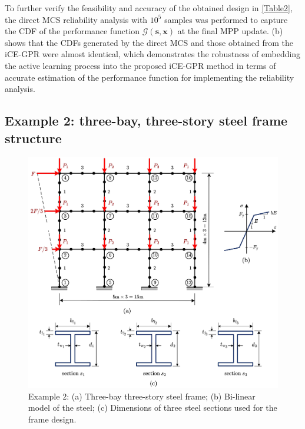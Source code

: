 \documentclass[preprint,3p]{elsarticle}
\begin{document}
\begin{linenumbers}
To further verify the feasibility and accuracy of the obtained design in \cref{Table2}, the direct MCS reliability analysis with $10^5$ samples was performed to capture the CDF of the performance function $\mathcal{G}(\textbf{s},\textbf{x})$ at the final MPP update. (b) shows that the CDFs generated by the direct MCS and those obtained from the iCE-GPR were almost identical, which demonstrates the robustness of embedding the active learning process into the proposed iCE-GPR method in terms of accurate estimation of the performance function for implementing the reliability analysis. 

\subsection{Example 2: three-bay, three-story steel frame structure}\label{SUBSEC:42}

\begin{figure}[ht]
    \begin{center}
        \includegraphics[scale=0.85]{Fig7.jpg}
    \end{center}
    \caption{Example 2: (a) Three-bay three-story steel frame; (b) Bi-linear model of the steel; (c) Dimensions of three steel sections used for the frame design.}
    \label{FIG:7}
\end{figure}


\end{linenumbers}
\end{document}
